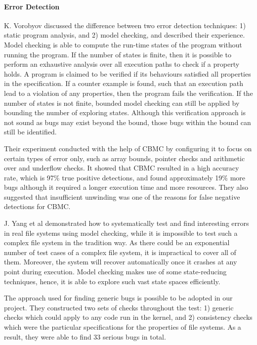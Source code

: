 \paragraph{Error Detection}
K. Vorobyov \cite{Lipka2014} discussed the difference between two error detection techniques: 1) static program analysis, and 2) model checking, and described their experience. Model checking is able to compute the run-time states of the program without running the program. If the number of states is finite, then it is possible to perform an exhaustive analysis over all execution paths to check if a property holds. A program is claimed to be verified if its behaviours satisfied all properties in the specification. If a counter example is found, such that an execution path lead to a violation of any properties, then the program fails the verification. If the number of states is not finite, bounded model checking can still be applied by bounding the number of exploring states. Although this verification approach is not sound as bugs may exist beyond the bound, those bugs within the bound can still be identified.

Their experiment conducted with the help of CBMC by configuring it to focus on certain types of error only, such as array bounds, pointer checks and arithmetic over and underflow checks. It showed that CBMC resulted in a high accuracy rate, which is 97\% true positive detections, and found approximately 19\% more bugs although it required a longer execution time and more resources. They also suggested that insufficient unwinding was one of the reasons for false negative detections for CBMC.

J. Yang et al \cite{Yang:2006:UMC:1189256.1189259} demonstrated how to systematically test and find interesting errors in real file systems using model checking, while it is impossible to test such a complex file system in the tradition way. As there could be an exponential number of test cases of a complex file system, it is impractical to cover all of them. Moreover, the system will recover automatically once it crashes at any point during execution. Model checking makes use of some state-reducing techniques, hence, it is able to explore such vast state spaces efficiently.

The approach used for finding generic bugs is possible to be adopted in our project. They constructed two sets of checks throughout the test: 1) generic checks which could apply to any code run in the kernel, and 2) consistency checks which were the particular specifications for the properties of file systems. As a result, they were able to find 33 serious bugs in total.

